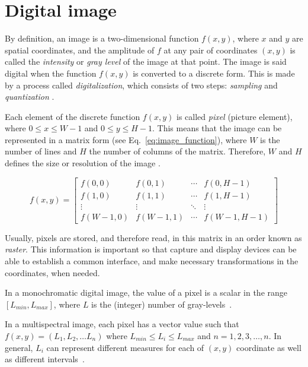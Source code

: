 \section{Digital image}
\label{sec:digital_image}
By definition, an image is a two-dimensional function $f(x, y)$, where $x$ and $y$ are spatial coordinates, and the amplitude of $f$ at any pair of coordinates $(x, y)$ is called the \textit{intensity} or \textit{gray level} of the image at that point. The image is said digital when the function $f(x, y)$ is converted to a discrete form. This is made by a process called \textit{digitalization}, which consists of two steps: \textit{sampling} and \textit{quantization} \citep{gonzalez:02}.

Each element of the discrete function $f(x, y)$ is called \textit{pixel} (picture element), where $0 \leq x \leq W - 1$ and $0 \leq y \leq H - 1$. This means that the image can be represented in a matrix form (see Eq.~\ref{eq:image_function}), where $W$ is the number of lines and $H$ the number of columns of the matrix. Therefore, $W$ and $H$ defines the size or resolution of the image \citep{pedrini:08}.

\begin{equation*}
f(x, y) =
 \begin{bmatrix}
  f(0, 0)     & f(0, 1)     & \cdots & f(0, H - 1) \\
  f(1, 0)     & f(1, 1)     & \cdots & f(1, H - 1) \\
  \vdots      & \vdots      & \ddots & \vdots  \\
  f(W - 1, 0) & f(W - 1, 1) & \cdots & f(W - 1, H - 1)
 \end{bmatrix}
\label{eq:image_function}
\end{equation*}

Usually, pixels are stored, and therefore read, in this matrix in an order known as \textit{raster}. This information is important so that capture and display devices can be able to establish a common interface, and make necessary transformations in the coordinates, when needed.

In a monochromatic digital image, the value of a pixel is a scalar in the range $[L_{min}, L_{max}]$, where $L$ is the (integer) number of gray-levels~\citep{pedrini:08}.

In a multispectral image, each pixel has a vector value such that $f(x, y) = (L_1, L_2, \ldots L_n)$ where $L_{min} \leq L_i \leq L_{max}$ and $n = 1, 2, 3, \ldots, n$. In general, $L_i$ can represent different measures for each of $(x, y)$ coordinate as well as different intervals~\citep{pedrini:08}.

